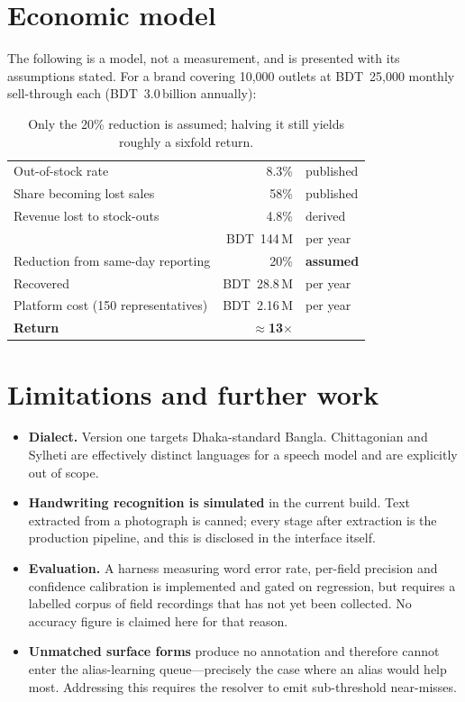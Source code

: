 \documentclass[11pt,a4paper]{article}
\begin{document}
\section{Economic model}

The following is a model, not a measurement, and is presented with its
assumptions stated. For a brand covering 10{,}000 outlets at BDT~25{,}000
monthly sell-through each (BDT~3.0\,billion annually):

\begin{table}[h]
\centering\small
\begin{tabular}{@{}l r l@{}}
\toprule
Out-of-stock rate & 8.3\% & published \\
Share becoming lost sales & 58\% & published \\
Revenue lost to stock-outs & 4.8\% & derived \\
& BDT~144\,M & per year \\
\midrule
Reduction from same-day reporting & 20\% & \textbf{assumed} \\
Recovered & BDT~28.8\,M & per year \\
Platform cost (150 representatives) & BDT~2.16\,M & per year \\
\midrule
\textbf{Return} & $\approx$\textbf{13$\times$} & \\
\bottomrule
\end{tabular}
\caption{Only the 20\% reduction is assumed; halving it still yields roughly a sixfold return.}
\end{table}

\section{Limitations and further work}

\begin{itemize}
  \item \textbf{Dialect.} Version one targets Dhaka-standard Bangla. Chittagonian
        and Sylheti are effectively distinct languages for a speech model and
        are explicitly out of scope.
  \item \textbf{Handwriting recognition is simulated} in the current build. Text
        extracted from a photograph is canned; every stage after extraction is
        the production pipeline, and this is disclosed in the interface itself.
  \item \textbf{Evaluation.} A harness measuring word error rate, per-field
        precision and confidence calibration is implemented and gated on
        regression, but requires a labelled corpus of field recordings that has
        not yet been collected. No accuracy figure is claimed here for that reason.
  \item \textbf{Unmatched surface forms} produce no annotation and therefore cannot
        enter the alias-learning queue---precisely the case where an alias would
        help most. Addressing this requires the resolver to emit sub-threshold
        near-misses.
\end{itemize}
\end{document}

